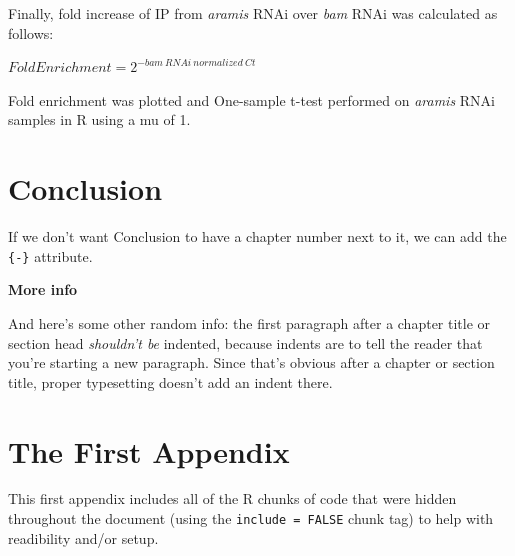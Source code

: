 \documentclass[12pt,oneside]{reedthesis}
\begin{document}
Finally, fold increase of IP from \emph{aramis} RNAi over \emph{bam} RNAi was
calculated as follows:

\(Fold Enrichment = 2^{-bam\ RNAi\ normalized\ Ct}\)

Fold enrichment was plotted and One-sample t-test performed on \emph{aramis}
RNAi samples in R using a mu of 1.

\hypertarget{conclusion}{%
\chapter*{Conclusion}\label{conclusion}}

If we don't want Conclusion to have a chapter number next to it, we can add the \texttt{\{-\}} attribute.

\textbf{More info}

And here's some other random info: the first paragraph after a chapter title or section head \emph{shouldn't be} indented, because indents are to tell the reader that you're starting a new paragraph. Since that's obvious after a chapter or section title, proper typesetting doesn't add an indent there.

\appendix

\hypertarget{the-first-appendix}{%
\chapter{The First Appendix}\label{the-first-appendix}}

This first appendix includes all of the R chunks of code that were hidden throughout the document (using the \texttt{include\ =\ FALSE} chunk tag) to help with readibility and/or setup.
\end{document}
